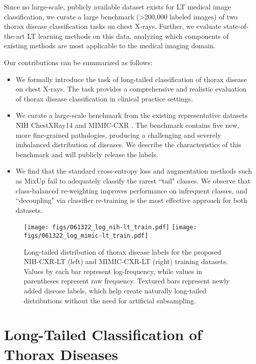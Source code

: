 \documentclass[runningheads]{llncs}
\begin{document}
Since no large-scale, publicly available dataset exists for LT medical image classification, we curate a large benchmark (\textgreater 200,000 labeled images) of two thorax disease classification tasks on chest X-rays. Further, we evaluate state-of-the-art LT learning methods on this data, analyzing which components of existing methods are most applicable to the medical imaging domain.

Our contributions can be summarized as follows:
\begin{itemize}[topsep=1pt, leftmargin=1.25cm]
    \item[] We formally introduce the task of long-tailed classification of thorax disease on chest X-rays. The task provides a comprehensive and realistic evaluation of thorax disease classification in clinical practice settings.
    \item[] We curate a large-scale benchmark from the existing representative datasets NIH ChestXRay14 \cite{wang2017learning} and MIMIC-CXR \cite{johnson2019mimic}. The benchmark contains five new, more fine-grained pathologies, producing a challenging and severely imbalanced distribution of diseases. We describe the characteristics of this benchmark and will publicly release the labels.
    \item[] We find that the standard cross-entropy loss and augmentation methods such as MixUp fail to adequately classify the rarest ``tail" classes. We observe that class-balanced re-weighting improves performance on infrequent classes, and ``decoupling" via classifier re-training is the most effective approach for both datasets.
\end{itemize}

\begin{figure}[!ht]
    \centering
    \texttt{[image: figs/061322\_log\_nih-lt\_train.pdf]}
    \texttt{[image: figs/061322\_log\_mimic-lt\_train.pdf]}
    \caption{Long-tailed distribution of thorax disease labels for the proposed NIH-CXR-LT (left) and MIMIC-CXR-LT (right) training datasets. Values by each bar represent log-frequency, while values in parentheses represent raw frequency. Textured bars represent newly added disease labels, which help create naturally long-tailed distributions without the need for artificial subsampling.}
    \label{fig:data}
\end{figure}


\section{Long-Tailed Classification of Thorax Diseases}
\raggedbottom
\end{document}
